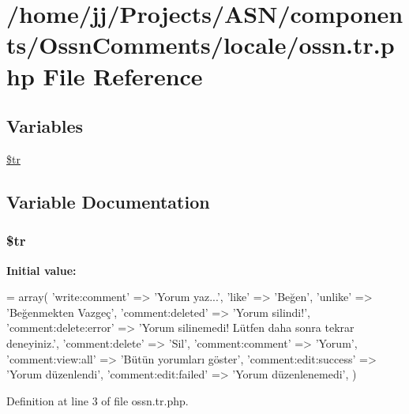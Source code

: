 \hypertarget{components_2_ossn_comments_2locale_2ossn_8tr_8php}{}\section{/home/jj/\+Projects/\+A\+S\+N/components/\+Ossn\+Comments/locale/ossn.tr.\+php File Reference}
\label{components_2_ossn_comments_2locale_2ossn_8tr_8php}
\subsection*{Variables}
\begin{DoxyCompactItemize}
\item 
\hyperlink{components_2_ossn_comments_2locale_2ossn_8tr_8php_a925f466a276b200c71b2567d39b4dba7}{\$tr}
\end{DoxyCompactItemize}


\subsection{Variable Documentation}
\subsubsection[{\texorpdfstring{\$tr}{$tr}}]{\setlength{\rightskip}{0pt plus 5cm}\$tr}\hypertarget{components_2_ossn_comments_2locale_2ossn_8tr_8php_a925f466a276b200c71b2567d39b4dba7}{}\label{components_2_ossn_comments_2locale_2ossn_8tr_8php_a925f466a276b200c71b2567d39b4dba7}
{\bfseries Initial value\+:}
\begin{DoxyCode}
= array(
    \textcolor{stringliteral}{'write:comment'} => \textcolor{stringliteral}{'Yorum yaz...'},
    \textcolor{stringliteral}{'like'} => \textcolor{stringliteral}{'Beğen'},
    \textcolor{stringliteral}{'unlike'} => \textcolor{stringliteral}{'Beğenmekten Vazgeç'},
    \textcolor{stringliteral}{'comment:deleted'} => \textcolor{stringliteral}{'Yorum silindi!'},
    \textcolor{stringliteral}{'comment:delete:error'} => \textcolor{stringliteral}{'Yorum silinemedi! Lütfen daha sonra tekrar deneyiniz.'},
    \textcolor{stringliteral}{'comment:delete'} => \textcolor{stringliteral}{'Sil'},
    \textcolor{stringliteral}{'comment:comment'} => \textcolor{stringliteral}{'Yorum'},
    \textcolor{stringliteral}{'comment:view:all'} => \textcolor{stringliteral}{'Bütün yorumları göster'},
    \textcolor{stringliteral}{'comment:edit:success'} => \textcolor{stringliteral}{'Yorum düzenlendi'},
    \textcolor{stringliteral}{'comment:edit:failed'} => \textcolor{stringliteral}{'Yorum düzenlenemedi'},
)
\end{DoxyCode}


Definition at line 3 of file ossn.\+tr.\+php.

